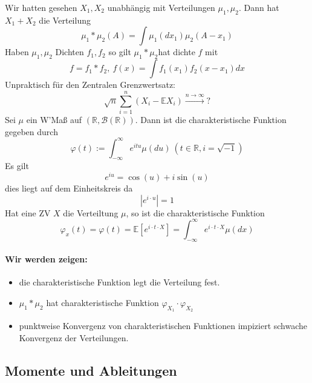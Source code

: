 \documentclass[10pt,a4paper]{report}
\numberwithin{equation}{section}
\numberwithin{figure}{section}
\theoremstyle{plain}
\theoremstyle{definition}
\theoremstyle{plain}
\theoremstyle{definition}
\theoremstyle{remark}
\theoremstyle{plain}
\theoremstyle{plain}
\theoremstyle{plain}
\theoremstyle{plain}
\theoremstyle{plain}
\newcommand{\1}{ \mathbb{1} } %
\begin{document}
 Wir hatten gesehen $X_{1},X_{2}$
unabhängig mit Verteilungen $\mu_{1},\mu_{2}$. Dann hat $X_{1}+X_{2}$
die Verteilung
\[
\mu_{1}*\mu_{2}\left(A\right)=\int\mu_{1}\left(dx_{1}\right)\mu_{2}\left(A-x_{1}\right)
\]
Haben $\mu_{1},\mu_{2}$ Dichten $f_{1},f_{2}$ so gilt $\mu_{1}*\mu_{2}$hat
dichte $f$ mit 
\[
f=f_{1}*f_{2},\ f\left(x\right)=\int f_{1}\left(x_{1}\right)f_{2}\left(x-x_{1}\right)dx
\]
Unpraktisch für den Zentralen Grenzwertsatz:
\[
\sqrt{n}\sum_{i=1}^{n}\left(X_{i}-\mathbb{E}X_{i}\right)\overset{n\to\infty}{\longrightarrow}?
\]
Sei $\mu$ ein W'Maß auf $\left(\mathbb{R},\mathcal{B}\left(\mathbb{R}\right)\right)$.
Dann ist die charakteristische Funktion gegeben durch 
\[
\varphi\left(t\right):=\int_{-\infty}^{\infty}e^{itu}\mu\left(du\right)\ \left(t\in\mathbb{R},i=\sqrt{-1}\right)
\]
Es gilt 
\[
e^{iu}=\cos\left(u\right)+i\sin\left(u\right)
\]
dies liegt auf dem Einheitskreis da
\[
\left|e^{i\cdot u}\right|=1
\]
Hat eine ZV $X$ die Verteiltung $\mu$, so ist die charakteristische
Funktion
\[
\varphi_{x}\left(t\right)=\varphi\left(t\right)=\mathbb{E}\left[e^{i\cdot t\cdot X}\right]=\int_{-\infty}^{\infty}e^{i\cdot t\cdot X}\mu\left(dx\right)
\]



\paragraph*{Wir werden zeigen:}
\begin{itemize}
\item die charakteristische Funktion legt die Verteilung fest.
\item $\mu_{1}*\mu_{2}$ hat charakteristische Funktion $\varphi_{X_{1}}\cdot\varphi_{X_{2}}$
\item punktweise Konvergenz von charakteristischen Funktionen impiziert
schwache Konvergenz der Verteilungen.
\end{itemize}

\subsection*{Momente und Ableitungen}
\end{document}
